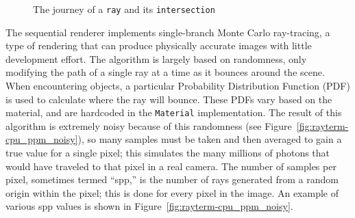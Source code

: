 \vspace{0.3em}
\begin{figure}[htb]
  \centering
  \caption{The journey of a \texttt{ray} and its \texttt{intersection}}
  \label{fig:rayterm-cpu_raytrace_journey_of_a_ray}
\end{figure}

 \label{ch:methods:renderer:sequential:algorithms}

The sequential renderer implements single-branch Monte Carlo ray-tracing, a type of rendering that can produce physically accurate images with little development effort.
The algorithm is largely based on randomness, only modifying the path of a single ray at a time as it bounces around the scene.
When encountering objects, a particular Probability Distribution Function (PDF) is used to calculate where the ray will bounce.
These PDFs vary based on the material, and are hardcoded in the \texttt{Material} implementation.
The result of this algorithm is extremely noisy because of this randomness (see Figure~\ref{fig:rayterm-cpu_ppm_noisy}), so many samples must be taken and then averaged to gain a true value for a single pixel; this simulates the many millions of photons that would have traveled to that pixel in a real camera.
The number of samples per pixel, sometimes termed ``spp,'' is the number of rays generated from a random origin within the pixel; this is done for every pixel in the image.
An example of various spp values is shown in Figure~\ref{fig:rayterm-cpu_ppm_noisy}.

